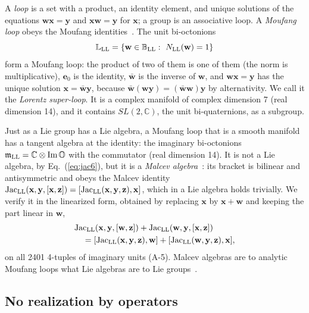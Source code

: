 A \emph{loop} is a set with a product, an identity element, and unique solutions of the equations
$\mathbf w\mathbf x=\mathbf y$ and $\mathbf x\mathbf w=\mathbf y$ for $\mathbf x$; a group is an
associative loop. A \emph{Moufang loop} obeys the Moufang identities~\cite{Moufang1935}. The unit
bi-octonions
\begin{equation}
\mathbb L_{\rm LL}=\{\mathbf w\in\mathbb B_{\rm LL}:\ N_{\rm LL}(\mathbf w)=1\}
\label{eq:loop}
\end{equation}
form a Moufang loop: the product of two of them is one of them (the norm is multiplicative), $\mathbf
e_0$ is the identity, $\bar{\mathbf w}$ is the inverse of $\mathbf w$, and $\mathbf w\mathbf x=\mathbf y$
has the unique solution $\mathbf x=\bar{\mathbf w}\mathbf y$, because $\bar{\mathbf w}(\mathbf w\mathbf
y)=(\bar{\mathbf w}\mathbf w)\mathbf y$ by alternativity. We call it the \emph{Lorentz super-loop}. It
is a complex manifold of complex dimension 7 (real dimension 14), and it contains $SL(2,\mathbb C)$,
the unit bi-quaternions, as a subgroup.

Just as a Lie group has a Lie algebra, a Moufang loop that is a smooth manifold has a tangent algebra
at the identity: the imaginary bi-octonions $\mathfrak m_{\rm LL}=\mathbb C\otimes{\rm Im}\,\mathbb O$
with the commutator (real dimension 14). It is not a Lie algebra, by Eq.~(\ref{eq:jac6}), but it is a
\emph{Malcev algebra}~\cite{Malcev1955,Sagle1961}: its bracket is bilinear and antisymmetric and obeys
the Malcev identity $\mathrm{Jac}_{\rm LL}(\mathbf x,\mathbf y,[\mathbf x,\mathbf z])=[\mathrm{Jac}_{\rm
LL}(\mathbf x,\mathbf y,\mathbf z),\mathbf x]$, which in a Lie algebra holds trivially. We verify it in
the linearized form, obtained by replacing $\mathbf x$ by $\mathbf x+\mathbf w$ and keeping the part
linear in $\mathbf w$,
\begin{align}
&\mathrm{Jac}_{\rm LL}(\mathbf x,\mathbf y,[\mathbf w,\mathbf z])+\mathrm{Jac}_{\rm LL}(\mathbf w,\mathbf y,[\mathbf x,\mathbf z])\nonumber\\
&\quad=[\mathrm{Jac}_{\rm LL}(\mathbf x,\mathbf y,\mathbf z),\mathbf w]+[\mathrm{Jac}_{\rm LL}(\mathbf w,\mathbf y,\mathbf z),\mathbf x],
\label{eq:malcev}
\end{align}
on all 2401 4-tuples of imaginary units (A-5). Malcev algebras are to analytic Moufang loops what Lie
algebras are to Lie groups~\cite{Malcev1955,Kuzmin1971,NagyStrambach2002}.

\subsection{No realization by operators}


